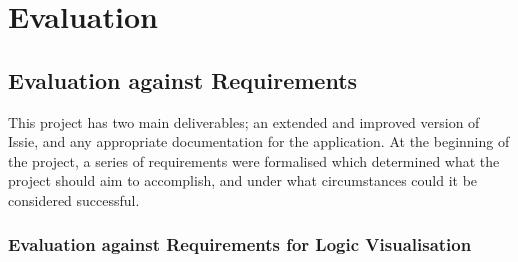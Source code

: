 \chapter{Evaluation}

\section{Evaluation against Requirements}
This project has two main deliverables; an extended and improved version of Issie, and any appropriate documentation for the application. At the beginning of the project, a series of requirements were formalised which determined what the project should aim to accomplish, and under what circumstances could it be considered successful. 
\subsection{Evaluation against Requirements for Logic Visualisation}
